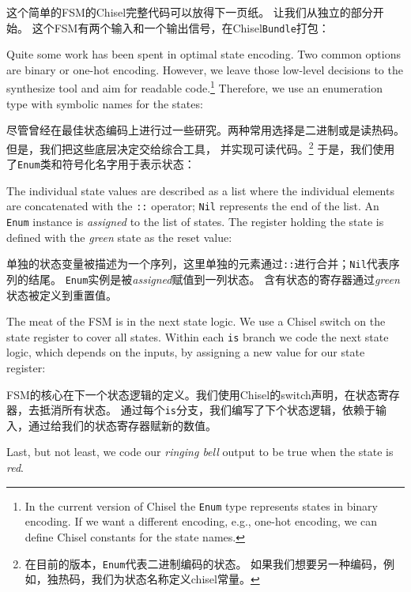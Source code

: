 \documentclass[%
    10pt,
    headinclude, footexclude,
    openright, %
    notitlepage,
    cleardoubleempty,
    headsepline,
    pointlessnumbers,
    bibtotoc, idxtotoc,
    ]{scrbook}
\newcommand{\code}[1]{{\small{\texttt{#1}}}}
\begin{document}
{这个简单的FSM的Chisel完整代码可以放得下一页纸。
让我们从独立的部分开始。
这个FSM有两个输入和一个输出信号，在Chisel\code{Bundle}打包：


\noindent Quite some work has been spent in optimal state encoding. Two common options
are binary or one-hot encoding. However, we leave those low-level decisions to
the synthesize tool and aim for readable code.\footnote{In the current version
of Chisel the \code{Enum} type represents states in binary encoding.
If we want a different encoding, e.g., one-hot encoding, we can define Chisel
constants for the state names.}
Therefore, we use an enumeration type with symbolic names for the states:

\noindent 尽管曾经在最佳状态编码上进行过一些研究。两种常用选择是二进制或是读热码。但是，我们把这些底层决定交给综合工具，
并实现可读代码。\footnote{在目前的版本，\code{Enum}代表二进制编码的状态。
如果我们想要另一种编码，例如，独热码，我们为状态名称定义chisel常量。}
于是，我们使用了\code{Enum}类和符号化名字用于表示状态：


\noindent The individual state values are described as a list where the individual
elements are concatenated with the \code{::} operator; \code{Nil} represents
the end of the list. An \code{Enum} instance is \emph{assigned} to the list of states.
The register holding the state is defined with the \emph{green} state as the reset value:

\noindent 单独的状态变量被描述为一个序列，这里单独的元素通过\code{::}进行合并；\code{Nil}代表序列的结尾。
\code{Enum}实例是被\emph{assigned}赋值到一列状态。
含有状态的寄存器通过\emph{green}状态被定义到重置值。



\noindent The meat of the FSM is in the next state logic. We use a Chisel switch on the
state register to cover all states. Within each \code{is} branch we code the next state
logic, which depends on the inputs, by assigning a new value for our state register:

\noindent FSM的核心在下一个状态逻辑的定义。我们使用Chisel的switch声明，在状态寄存器，去抵消所有状态。
通过每个\code{is}分支，我们编写了下个状态逻辑，依赖于输入，通过给我们的状态寄存器赋新的数值。


\noindent Last, but not least, we code our \emph{ringing bell} output to be true when
the state is \emph{red}.

}
\end{document}
